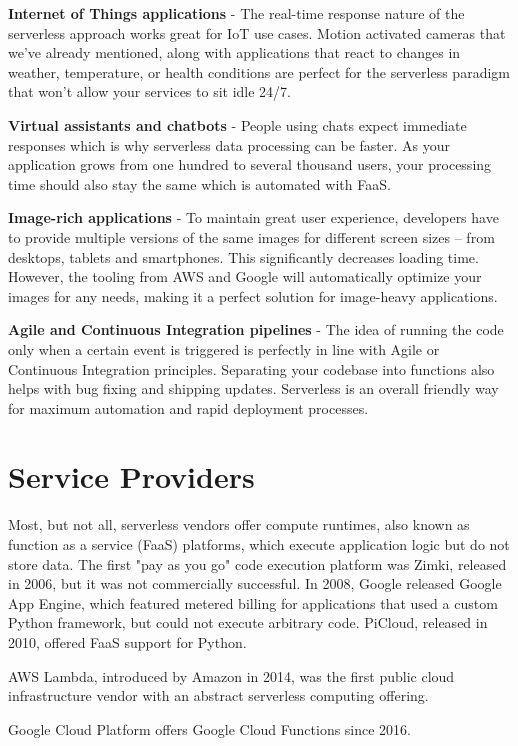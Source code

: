 \textbf{Internet of Things applications} - The real-time response nature of the serverless approach works great for
IoT use cases. Motion activated cameras that we’ve already mentioned, along with applications that react to
changes in weather, temperature, or health conditions are perfect for the serverless paradigm that won’t allow
your services to sit idle 24/7.

\textbf{Virtual assistants and chatbots} - People using chats expect immediate responses which is why serverless
data processing can be faster. As your application grows from one hundred to several thousand users, your
processing time should also stay the same which is automated with FaaS.

\textbf{Image-rich applications} - To maintain great user experience, developers have to provide multiple versions
of the same images for different screen sizes – from desktops, tablets and smartphones. This significantly
decreases loading time. However, the tooling from AWS and Google will automatically optimize your
images for any needs, making it a perfect solution for image-heavy applications.

\textbf{Agile and Continuous Integration pipelines} - The idea of running the code only when a certain event is
triggered is perfectly in line with Agile or Continuous Integration principles. Separating your codebase into
functions also helps with bug fixing and shipping updates. Serverless is an overall friendly way for maximum
automation and rapid deployment processes.

\section{Service Providers}

Most, but not all, serverless vendors offer compute runtimes, also known as function as a service (FaaS) platforms, which execute application logic but do not store data. The first "pay as you go" code execution platform was Zimki, released in 2006, but it was not commercially successful. In 2008, Google released Google App Engine, which featured metered billing for applications that used a custom Python framework, but could not execute arbitrary code. PiCloud, released in 2010, offered FaaS support for Python.

AWS Lambda, introduced by Amazon in 2014, was the first public cloud infrastructure vendor with an abstract serverless computing offering.

Google Cloud Platform offers Google Cloud Functions since 2016.

